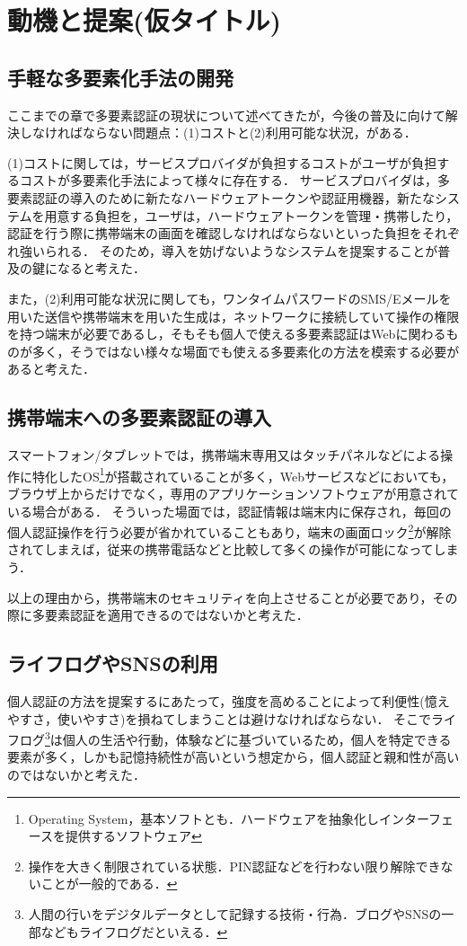 \chapter{動機と提案(仮タイトル)}\label{chap:motive}
\section{手軽な多要素化手法の開発}
ここまでの章で多要素認証の現状について述べてきたが，今後の普及に向けて解決しなければならない問題点：(1)コストと(2)利用可能な状況，がある．

(1)コストに関しては，サービスプロバイダが負担するコストがユーザが負担するコストが多要素化手法によって様々に存在する．
サービスプロバイダは，多要素認証の導入のために新たなハードウェアトークンや認証用機器，新たなシステムを用意する負担を，ユーザは，ハードウェアトークンを管理・携帯したり，認証を行う際に携帯端末の画面を確認しなければならないといった負担をそれぞれ強いられる．
そのため，導入を妨げないようなシステムを提案することが普及の鍵になると考えた．

また，(2)利用可能な状況に関しても，ワンタイムパスワードのSMS/Eメールを用いた送信や携帯端末を用いた生成は，ネットワークに接続していて操作の権限を持つ端末が必要であるし，そもそも個人で使える多要素認証はWebに関わるものが多く，そうではない様々な場面でも使える多要素化の方法を模索する必要があると考えた．

\section{携帯端末への多要素認証の導入}
スマートフォン/タブレットでは，携帯端末専用又はタッチパネルなどによる操作に特化したOS\footnote{Operating System，基本ソフトとも．ハードウェアを抽象化しインターフェースを提供するソフトウェア}が搭載されていることが多く，Webサービスなどにおいても，ブラウザ上からだけでなく，専用のアプリケーションソフトウェアが用意されている場合がある．
そういった場面では，認証情報は端末内に保存され，毎回の個人認証操作を行う必要が省かれていることもあり，端末の画面ロック\footnote{操作を大きく制限されている状態．PIN認証などを行わない限り解除できないことが一般的である．}が解除されてしまえば，従来の携帯電話などと比較して多くの操作が可能になってしまう．

以上の理由から，携帯端末のセキュリティを向上させることが必要であり，その際に多要素認証を適用できるのではないかと考えた．

\section{ライフログやSNSの利用}
個人認証の方法を提案するにあたって，強度を高めることによって利便性(憶えやすさ，使いやすさ)を損ねてしまうことは避けなければならない．
そこでライフログ\footnote{人間の行いをデジタルデータとして記録する技術・行為．ブログやSNSの一部などもライフログだといえる．}は個人の生活や行動，体験などに基づいているため，個人を特定できる要素が多く，しかも記憶持続性が高いという想定から，個人認証と親和性が高いのではないかと考えた．

